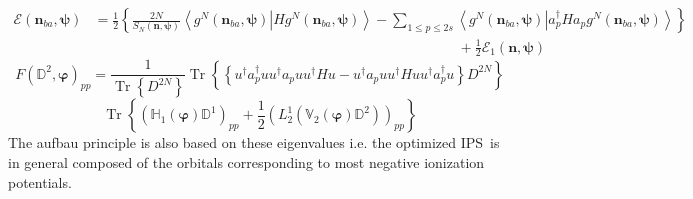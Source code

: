 \documentclass[aps,preprint]{revtex4}%
\begin{document}
\begin{align}
\mathcal{E}\left(  \mathbf{n}_{ba},\mathbf{\psi}\right)   &  =\frac{1}%
{2}\left\{  \frac{2N}{S_{N}\left(  \mathbf{n},\mathbf{\psi}\right)
}\left\langle \left.  g^{N}\left(  \mathbf{n}_{ba},\mathbf{\psi}\right)
\right\vert Hg^{N}\left(  \mathbf{n}_{ba},\mathbf{\psi}\right)  \right\rangle
-%
{\textstyle\sum\limits_{1\leq p\leq2s}}
\left\langle \left.  g^{N}\left(  \mathbf{n}_{ba},\mathbf{\psi}\right)
\right\vert a_{p}^{\dagger}Ha_{p}g^{N}\left(  \mathbf{n}_{ba},\mathbf{\psi
}\right)  \right\rangle \right\}  \\
&  \qquad\qquad\qquad\qquad\qquad\qquad\qquad\qquad\qquad\qquad\qquad
\qquad\qquad+\frac{1}{2}\mathcal{E}_{1}\left(  \mathbf{n},\mathbf{\psi
}\right)
\end{align}%
\begin{equation}
F\left(  \mathbb{D}^{2},\mathbf{\varphi}\right)  _{pp}=\frac{1}%
{\operatorname{Tr}\left\{  D^{2N}\right\}  }\operatorname{Tr}\left\{
\overset{}{\left\{  u^{\dagger}a_{p}^{\dagger}uu^{\dagger}a_{p}uu^{\dagger
}Hu-u^{\dagger}a_{p}uu^{\dagger}Huu^{\dagger}a_{p}^{\dagger}u\right\}  }%
D^{2N}\right\}
\end{equation}%
\begin{equation}
\operatorname{Tr}\left\{  \left(  \mathbb{H}_{1}\left(  \mathbf{\varphi
}\right)  \mathbb{D}^{1}\right)  _{pp}+\frac{1}{2}\left(  L_{2}^{1}\left(
\mathbb{V}_{2}\left(  \mathbf{\varphi}\right)  \mathbb{D}^{2}\right)  \right)
_{pp}\right\}
\end{equation}
The aufbau principle is also based on these eigenvalues i.e. the optimized
IPS\ is in general composed of the orbitals corresponding to most negative
ionization potentials.
\end{document}

